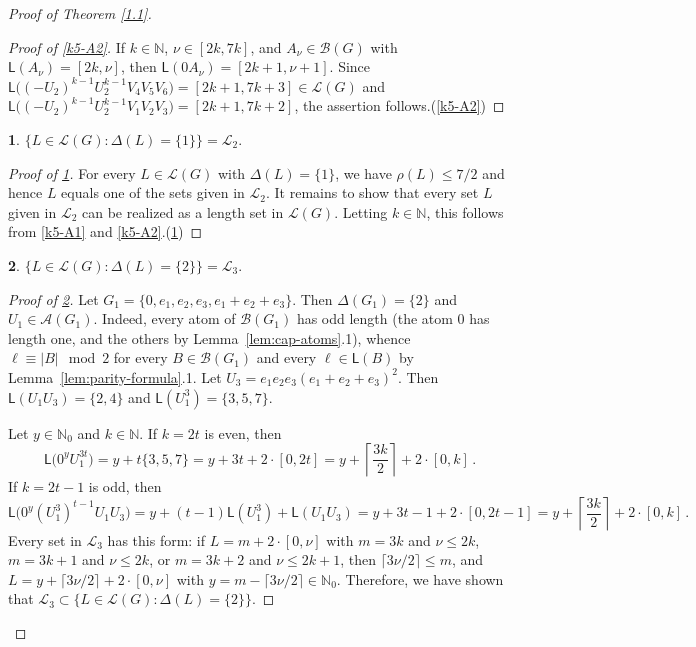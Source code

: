 \documentclass[a4paper, 10pt]{amsart}
\theoremstyle{plain}
\theoremstyle{definition}
\theoremstyle{definition}
\newtheorem{claim}{}[theorem]
\newcommand{\N}{\mathbb N}
\numberwithin{equation}{section}
\begin{document}
\begin{proof}[Proof of Theorem \ref{1.1}]
\begin{proof}[Proof of \ref{k5-A2}] If  $k \in \N$, $\nu \in [2k, 7k]$, and $A_{\nu} \in \mathcal B (G)$ with $\mathsf L (A_{\nu}) = [2k, \nu]$, then $\mathsf L (0 A_{\nu}) = [2k+1, \nu+1]$. Since $\mathsf L \big((-U_2)^{k-1}U_2^{k-1}V_4V_5V_6 \big) = [2k+1, 7k+3] \in \mathcal L (G)$ and $\mathsf L \big((-U_2)^{k-1}U_2^{k-1}V_1V_2V_3 \big)=[2k+1, 7k+2]$, the assertion follows.\qedhere (\ref{k5-A2})
\end{proof}


\begin{claim}\label{k5-S1}
	$\big\{L\in \mathcal L(G)\colon \Delta (L)=\{1\} \big\}=\mathcal L_2$.
\end{claim}

\begin{proof}[Proof of \ref{k5-S1}]
	For every $L \in \mathcal L (G)$ with $\Delta (L)=\{1\}$, we have   $\rho(L)\le 7/2$ and hence $L$ equals one of the sets given in $\mathcal L_2$. It remains to show that every set $L$ given in $\mathcal L_2$ can be realized as a length set in $\mathcal L (G)$. Letting $k \in \N$, this follows from  \ref{k5-A1} and \ref{k5-A2}.\qedhere (\ref{k5-S1})
\end{proof}

\begin{claim}\label{k5-S2}  $\big\{L\in \mathcal L(G)\colon \Delta (L)=\{2\} \big\}=\mathcal L_3$.
\end{claim}

\begin{proof}[Proof of \ref{k5-S2}]
	Let $G_1=\{0,e_1,e_2,e_3,e_1+e_2+e_3\}$. Then $\Delta(G_1)=\{2\}$ and $U_1\in \mathcal A(G_1)$. Indeed, every atom of $\mathcal B (G_1)$ has odd length (the atom $0$ has length one, and the others by  Lemma~\ref{lem:cap-atoms}.1), whence $\ell \equiv |B| \mod 2$ for every $B \in \mathcal B (G_1)$ and every $\ell \in \mathsf L (B)$ by  Lemma~\ref{lem:parity-formula}.1.  Let $U_3=e_1e_2e_3(e_1+e_2+e_3)^2$. Then $\mathsf L(U_1U_3)=\{2,4\}$ and $\mathsf L(U_1^3)=\{3,5,7\}$.
	
	Let $y\in \N_0$ and $k\in \N$. If $k=2t$ is even, then
	\[
	\mathsf L \big(0^y  U_1^{3t} \big)=y+t\{3,5,7\}=y+3t+2\cdot [0,2t]=y+\left\lceil\frac{3k}{2}\right\rceil+2\cdot [0,k]\,.
	\]
	If $k=2t-1$ is odd, then
	\[
	\mathsf L \big(0^y  (U_1^3)^{t-1}U_1U_3 \big)=y+(t-1)\mathsf L(U_1^3)+\mathsf L(U_1U_3)=y+3t-1+2\cdot [0, 2t-1]=y+\left\lceil\frac{3k}{2}\right\rceil+2\cdot [0,k]\,.
	\]
	Every set in $\mathcal L_3$ has this form: if $L = m + 2 \cdot [0,\nu]$ with
	$m = 3k$ and $\nu \le 2k$, $m = 3k+1$ and $\nu \le 2k$, or $m = 3k+2$ and
	$\nu \le 2k+1$, then $\lceil 3\nu/2 \rceil \le m$, and
	$L = y + \lceil 3\nu/2 \rceil + 2 \cdot [0,\nu]$ with $y = m - \lceil 3\nu/2 \rceil \in \N_0$.
	Therefore, we have shown that $\mathcal L_3\subset \{L\in \mathcal L(G)\colon \Delta (L)=\{2\}\}$.



\end{proof}
\end{proof}
\end{document}
